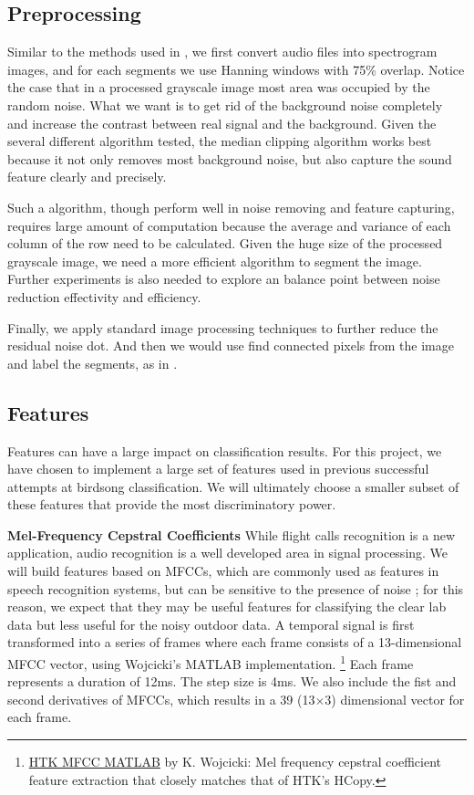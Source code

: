 \documentclass{article} %
\begin{document}
\subsection{Preprocessing}

Similar to the methods used in \cite{Lasseck13}, we first convert audio files into spectrogram images, and for each segments we use Hanning windows with 75\% overlap. Notice the case that in a processed grayscale image most area was occupied by the random noise. What we want is to get rid of the background noise completely and increase the contrast between real signal and the background. Given the several different algorithm tested, the median clipping algorithm \cite{mlsp1} works best because it not only removes most background noise, but also capture the sound feature clearly and precisely. 

Such a algorithm, though perform well in noise removing and feature capturing, requires large amount of computation because the average and variance of each column of the row need to be calculated. Given the huge size of the processed grayscale image, we need a more efficient algorithm to segment the image. Further experiments is also needed to explore an balance point between noise reduction effectivity and efficiency.

Finally, we apply standard image processing techniques to further reduce the residual noise dot. And then we would use find connected pixels from the image and label the segments, as in \cite{Lasseck13}.

\subsection{Features}
\label{sec:Features}

Features can have a large impact on classification results. For this project, we have chosen to implement a large set of features used in previous successful attempts at birdsong classification. We will ultimately choose a smaller subset of these features that provide the most discriminatory power. 


\textbf{Mel-Frequency Cepstral Coefficients}
While flight calls recognition is a new application, audio recognition is a well developed area in signal processing. We will build features based on MFCCs, which are commonly used as features in speech recognition systems, but can be sensitive to the presence of noise \cite{tyagi2005desensitizing}; for this reason, we expect that they may be
useful features for classifying the clear lab data but less useful for the noisy outdoor data. A temporal signal is first transformed into a series of frames where each frame consists of a 13-dimensional MFCC vector, using Wojcicki's MATLAB
implementation. \footnote{\scriptsize \href{http://www.mathworks.com/matlabcentral/fileexchange/32849-htk-mfcc-matlab/content/mfcc/mfcc.m}{HTK MFCC MATLAB} by K. Wojcicki: Mel frequency cepstral coefficient feature extraction that closely matches that of HTK's HCopy.} Each frame represents a duration of 12ms. The step size is 4ms. We also include the fist and second derivatives of MFCCs, which results in a 39 (13$\times$3) dimensional vector for each frame.
\end{document}
